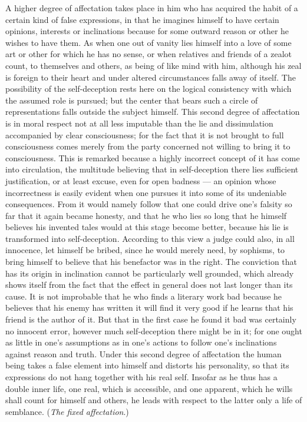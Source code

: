 \documentclass[12pt,a4paper,openany]{book}
\newcommand{\opage}[1]{\marginnote{\footnotesize\textit{[#1]}}}
\begin{document}
A higher degree of affectation takes place in him who has acquired the habit of a
certain kind of false expressions, in that he imagines himself to have certain
opinions, interests or inclinations because for some outward reason or other he
wishes to have them. As when one out of vanity lies himself into a love of some art
or other for which he has no sense, or when relatives and friends of a zealot count,
to themselves and others, as being of like mind with him, although his zeal is
foreign to their heart and under altered circumstances falls away of itself. The
possibility of the self-deception rests here on the logical consistency with which the
assumed role is pursued; but the center that bears such a circle of representations
falls outside the subject himself. This second degree of affectation is in moral
respect not at all less imputable than the lie and dissimulation accompanied by clear
consciousness; for the fact that it is not brought to full consciousness comes merely
from the party concerned not willing to bring it to consciousness. This is remarked
because a highly incorrect concept of it has come into circulation, the multitude
believing that in self-deception there lies sufficient justification, or at least
excuse, even for open badness --- an opinion whose incorrectness is easily evident
when one pursues it into some of its undeniable consequences. From it would namely
follow that one could drive one's falsity so far that it again became honesty, and
that he who lies so long that he himself believes his invented tales would at
\setcounter{footnote}{0}%
\opage{160}this stage become better, because his lie is transformed into self-deception.
According to this view a judge could also, in all innocence, let himself be bribed,
since he would merely need, by sophisms, to bring himself to believe that his
benefactor was in the right. The conviction that has its origin in inclination cannot
be particularly well grounded, which already shows itself from the fact that the
effect in general does not last longer than its cause. It is not improbable that he
who finds a literary work bad because he believes that his enemy has written it will
find it very good if he learns that his friend is the author of it. But that in the
first case he found it bad was certainly no innocent error, however much
self-deception there might be in it; for one ought as little in one's assumptions as
in one's actions to follow one's inclinations against reason and truth. Under this
second degree of affectation the human being takes a false element into himself and
distorts his personality, so that its expressions do not hang together with his real
self. Insofar as he thus has a double inner life, one real, which is accessible, and
one apparent, which he wills shall count for himself and others, he leads with
respect to the latter only a life of semblance. (\emph{The fixed affectation}.)
\end{document}

